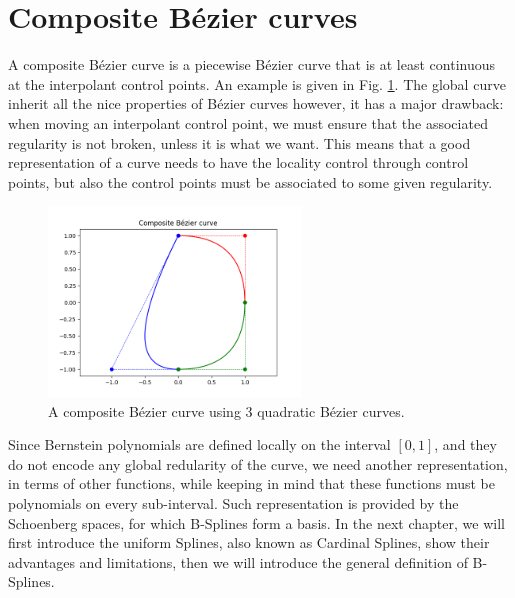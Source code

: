 \section{Composite B\'ezier curves}
A composite B\'ezier curve is a piecewise B\'ezier curve that is at least continuous at the interpolant control points. An example is given in Fig. \ref{fig:composite-bezier-curve}. The global curve inherit all the nice properties of B\'ezier curves however, it has a major drawback: when moving an interpolant control point, we must ensure that the associated regularity is not broken, unless it is what we want. This means that a good representation of a curve needs to have the locality control through control points, but also the control points must be associated to some given regularity. 
\begin{figure}
  \centering
  \includegraphics[width=0.6\textwidth]{figures/cad/composite_bezier_curve}
\caption{A composite B\'ezier curve using 3 quadratic B\'ezier curves.}
\label{fig:composite-bezier-curve}
\end{figure}
\noindent
Since Bernstein polynomials are defined locally on the interval $\left[ 0, 1 \right]$, and they do not encode any global redularity of the curve, we need another representation, in terms of other functions, while keeping in mind that these functions must be polynomials on every sub-interval. Such representation is provided by the Schoenberg spaces, for which B-Splines form a basis. In the next chapter, we will first introduce the uniform Splines, also known as Cardinal Splines, show their advantages and limitations, then we will introduce the general definition of B-Splines.





